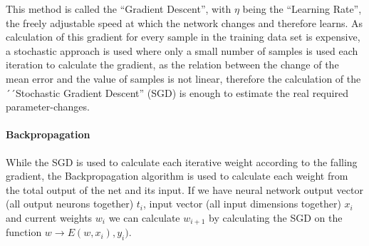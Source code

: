 This method is called the ``Gradient Descent'', with \(\eta\) being the ``Learning Rate'', the freely adjustable speed at which the network changes and therefore learns. As calculation of this gradient for every sample in the training data set is expensive, a stochastic approach is used where only a small number of samples is used each iteration to calculate the gradient, as the relation between the change of the mean error and the value of samples is not linear, therefore the calculation of the ´´Stochastic Gradient Descent'' (SGD) is enough to estimate the real required parameter-changes.

\paragraph{Backpropagation} While the SGD is used to calculate each iterative weight according to the falling gradient, the Backpropagation algorithm is used to calculate each weight from the total output of the net and its input. If we have neural network output vector (all output neurons together) \(t_i\), input vector (all input dimensions together) \(x_i\) and current weights \(w_i\) we can calculate \(w_{i+1}\) by calculating the SGD on the function \(w \rightarrow E(w, x_i), y_i)\).


